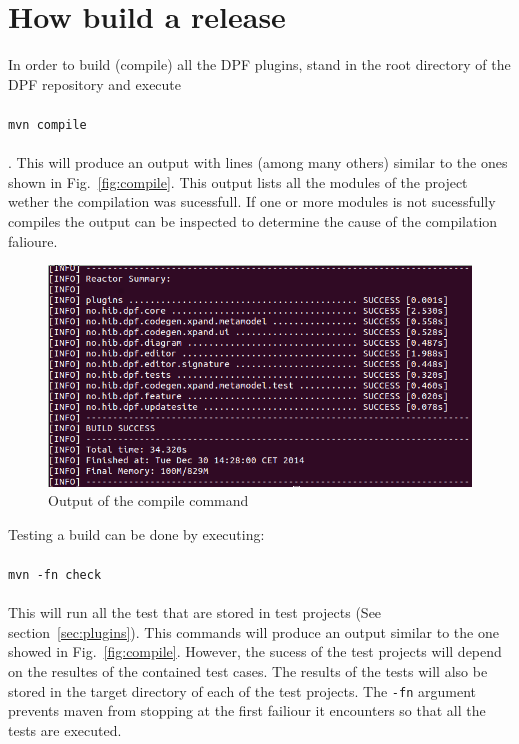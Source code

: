 \documentclass[a4paper]{article}
\newcommand{\code}[1]{\\ \\ \texttt{#1} \\ \\ }
\begin{document}
\section{How build a release}

In order to build (compile) all the DPF plugins, stand in the root directory of the DPF repository and execute \code{mvn compile}. This will produce an
output with lines (among many others) similar to the ones shown in Fig.~\ref{fig:compile}. This output lists all the modules of the project wether the compilation was 
sucessfull. If one or more modules is not sucessfully compiles the output can be inspected to determine the cause of the compilation falioure. 

\begin{figure}
\includegraphics[width=\linewidth]{compile}

\caption{Output of the compile command}
\end{figure}

Testing a build can be done by executing: \code{mvn -fn check}
This will run all the test that are stored in test projects (See section~\ref{sec:plugins}).
This commands will produce an output similar to the one showed in Fig.~\ref{fig:compile}. However, the sucess of the test projects will depend on the resultes of the 
contained test cases. The results of the tests will also be stored in the target directory of each of the test projects. The \texttt{-fn} argument prevents maven from stopping at the first failiour it encounters so that all the tests are executed.

\end{document}
